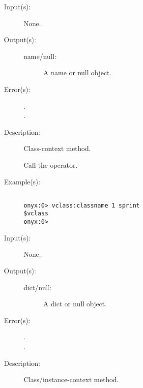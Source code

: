 \begin{description}
\label{vclass:classname}
\item[{\onyxop{--}{classname}{name/null}}: ]
	\begin{description}\item[]
	\item[Input(s): ] None.
	\item[Output(s): ]
		\begin{description}\item[]
		\item[name/null: ]
			A name or null object.
		\end{description}
	\item[Error(s): ]
		\begin{description}\item[]
		\item[.]
		\item[.]
		\end{description}
	\item[Description: ]
		Class-context method.

		Call the 
		operator.
	\item[Example(s): ]\begin{verbatim}

onyx:0> vclass:classname 1 sprint
$vclass
onyx:0>
		\end{verbatim}
	\end{description}
\label{vclass:data}
\item[{\onyxop{--}{data}{dict/null}}: ]
	\begin{description}\item[]
	\item[Input(s): ] None.
	\item[Output(s): ]
		\begin{description}\item[]
		\item[dict/null: ]
			A dict or null object.
		\end{description}
	\item[Error(s): ]
		\begin{description}\item[]
		\item[.]
		\item[.]
		\end{description}
	\item[Description: ]
		Class/instance-context method.


\end{description}
\end{description}
